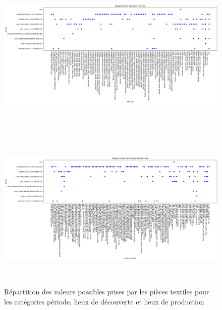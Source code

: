 \begin{figure}[!h]
    \begin{minipage}[c]{.5\linewidth}
            \begin{center}
                \includegraphics[height=8cm, angle=-90]{../images/R_period_find_site.png}
            \end{center}
    \end{minipage}
        \begin{minipage}[c]{.5\linewidth}
        \begin{center}
        		\includegraphics[height=8cm, angle=-90]{../images/R_period_production_site.png}
	\end{center}
    \end{minipage}
    \caption{Répartition des valeurs possibles prises par les pièces textiles pour les catégories période, lieux de découverte et lieux de production}
    \label{fig:place_period}   
\end{figure}
  
